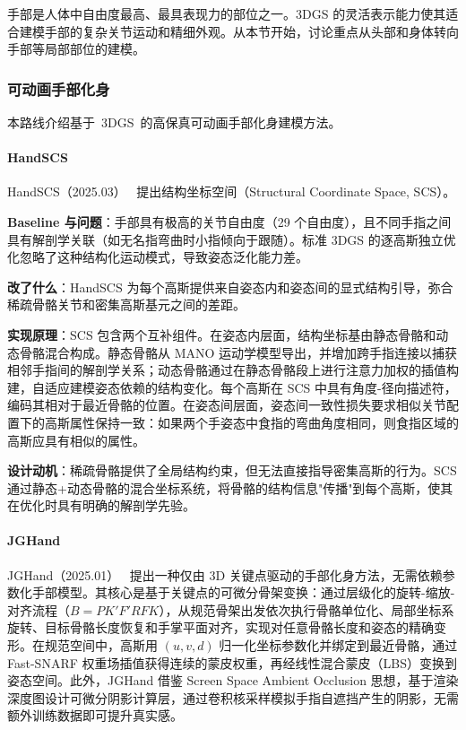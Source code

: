手部是人体中自由度最高、最具表现力的部位之一。3DGS 的灵活表示能力使其适合建模手部的复杂关节运动和精细外观。从本节开始，讨论重点从头部和身体转向手部等局部部位的建模。

\subsubsection{可动画手部化身}

本路线介绍基于~3DGS~的高保真可动画手部化身建模方法。

\paragraph{HandSCS}

HandSCS（2025.03）~\cite{2503_14736} 提出结构坐标空间（Structural Coordinate Space, SCS）。

\textbf{Baseline 与问题}：手部具有极高的关节自由度（29 个自由度），且不同手指之间具有解剖学关联（如无名指弯曲时小指倾向于跟随）。标准 3DGS 的逐高斯独立优化忽略了这种结构化运动模式，导致姿态泛化能力差。

\textbf{改了什么}：HandSCS 为每个高斯提供来自姿态内和姿态间的显式结构引导，弥合稀疏骨骼关节和密集高斯基元之间的差距。

\textbf{实现原理}：SCS 包含两个互补组件。在姿态内层面，结构坐标基由静态骨骼和动态骨骼混合构成。静态骨骼从 MANO 运动学模型导出，并增加跨手指连接以捕获相邻手指间的解剖学关系；动态骨骼通过在静态骨骼段上进行注意力加权的插值构建，自适应建模姿态依赖的结构变化。每个高斯在 SCS 中具有角度-径向描述符，编码其相对于最近骨骼的位置。在姿态间层面，姿态间一致性损失要求相似关节配置下的高斯属性保持一致：如果两个手姿态中食指的弯曲角度相同，则食指区域的高斯应具有相似的属性。

\textbf{设计动机}：稀疏骨骼提供了全局结构约束，但无法直接指导密集高斯的行为。SCS 通过静态+动态骨骼的混合坐标系统，将骨骼的结构信息"传播"到每个高斯，使其在优化时具有明确的解剖学先验。

\paragraph{JGHand}

JGHand（2025.01）~\cite{2501_19088} 提出一种仅由 3D 关键点驱动的手部化身方法，无需依赖参数化手部模型。其核心是基于关键点的可微分骨架变换：通过层级化的旋转-缩放-对齐流程（$B = PK'F'RFK$），从规范骨架出发依次执行骨骼单位化、局部坐标系旋转、目标骨骼长度恢复和手掌平面对齐，实现对任意骨骼长度和姿态的精确变形。在规范空间中，高斯用 $(u,v,d)$ 归一化坐标参数化并绑定到最近骨骼，通过 Fast-SNARF 权重场插值获得连续的蒙皮权重，再经线性混合蒙皮（LBS）变换到姿态空间。此外，JGHand 借鉴 Screen Space Ambient Occlusion 思想，基于渲染深度图设计可微分阴影计算层，通过卷积核采样模拟手指自遮挡产生的阴影，无需额外训练数据即可提升真实感。

